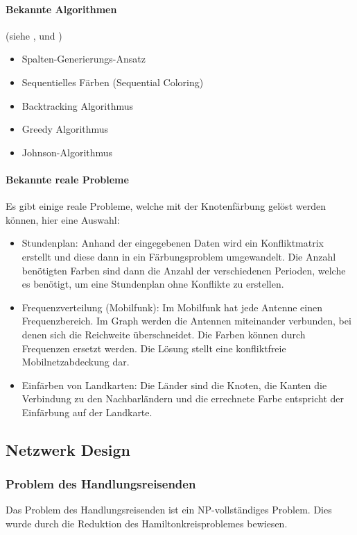 	\paragraph{Bekannte Algorithmen}
	(siehe \cite{seminar_algo_graph}, \cite{krumke2012graphentheoretische} und \cite{seminar_rob_graphen})
	\begin{itemize}
		\item Spalten-Generierungs-Ansatz
		\item Sequentielles Färben (Sequential Coloring)
		\item Backtracking Algorithmus
		\item Greedy Algorithmus
		\item Johnson-Algorithmus
	\end{itemize}	

	\paragraph{Bekannte reale Probleme}	
	Es gibt einige reale Probleme, welche mit der Knotenfärbung gelöst werden können, hier eine Auswahl:
	\begin{itemize}
		\item Stundenplan: Anhand der eingegebenen Daten wird ein Konfliktmatrix erstellt und diese dann in ein Färbungsproblem umgewandelt. Die Anzahl benötigten Farben sind dann 
			die Anzahl der verschiedenen Perioden, welche es benötigt, um eine Stundenplan ohne Konflikte zu erstellen. \cite{ieee_exam_table_graph_coloring} \cite{time_table_graph_coloring} \cite{timetabling_abdullah}
		\item Frequenzverteilung (Mobilfunk): Im Mobilfunk hat jede Antenne einen Frequenzbereich. Im Graph werden die Antennen miteinander verbunden, bei denen sich die 
			Reichweite überschneidet. Die Farben können durch Frequenzen ersetzt werden. Die Lösung stellt eine konfliktfreie Mobilnetzabdeckung dar. \cite{seminar_rob_graphen}
		\item Einfärben von Landkarten: Die Länder sind die Knoten, die Kanten die Verbindung zu den Nachbarländern und die errechnete Farbe entspricht der Einfärbung auf der 
			Landkarte. \cite{seminar_rob_graphen}
	\end{itemize}

\newpage
\subsection{Netzwerk Design}\label{network_design}

	\subsubsection{Problem des Handlungsreisenden}\label{tsp}
	Das Problem des Handlungsreisenden ist ein NP-vollständiges Problem. Dies wurde durch die Reduktion des Hamiltonkreisproblemes bewiesen.

